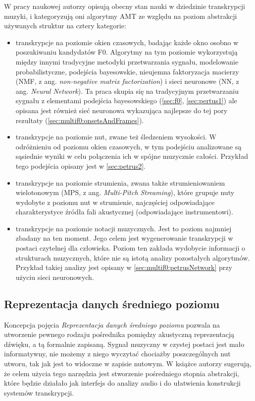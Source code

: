 \documentclass[12pt,a4paper,twoside]{mwart}
\begin{document}
W pracy naukowej 
\cite[22-24]{DBLP:journals/spm/BenetosDDE19}
 autorzy opisują obecny stan nauki w dziedzinie transkrypcji muzyki, i kategoryzują oni algorytmy AMT ze względu na poziom abstrakcji używanych struktur na cztery kategorie:
\begin{itemize}
  \item transkrypcje na poziomie okien czasowych, badając każde okno osobno w poszukiwaniu kandydatów F0. Algorytmy na tym poziomie wykorzystują między innymi tradycyjne metodyki przetwarzania sygnału, modelowanie probabilistyczne, podejścia bayesowskie, nieujemna faktoryzacja macierzy (NMF, z ang. \textit{non-negative matrix factorization}) i sieci neuronowe (NN, z ang. \textit{Neural Network}). Ta praca skupia się na tradycyjnym przetwarzaniu sygnału z elementami podejścia bayesowskiego (\ref{sec:f0}, \ref{sec:pertus1}) ale opisana jest również sieć neuronowa wykazująca najlepsze do tej pory rezultaty (\ref{sec:multif0:onsetsAndFrames}).
  \item transkrypcje na poziomie nut, zwane też śledzeniem wysokości. W odróżnieniu od poziomu okien czasowych, w tym podejściu analizowane są sąsiednie wyniki w celu połączenia ich w spójne muzycznie całości. Przykład tego podejścia opisany jest w \ref{sec:petrus2}.
  \item transkrypcje na poziomie strumienia, zwana także strumieniowaniem wielotonowym (MPS, z ang. \textit{Multi-Pitch Streaming}), które grupuje nuty wydobyte z poziomu nut w strumienie, najczęściej odpowiadające charakterystyce źródła fali akustycznej (odpowiadające instrumentowi).
  \item transkrypcje na poziomie notacji muzycznych. Jest to poziom najmniej zbadany na ten moment. Jego celem jest wygenerowanie transkrypcji w postaci czytelnej dla człowieka. Poziom ten zakłada wydobycie informacji  o strukturach muzycznych, które nie są istotą analizy pozostałych algorytmów. Przykład takiej analizy jest opisany w \ref{sec:multif0:petrusNetwork} przy użyciu sieci neuronowych.
\end{itemize}


\subsection{Reprezentacja danych średniego poziomu}
Koncepcja pojęcia \textit{Reprezentacja danych średniego poziomu} pozwala na utworzenie pewnego rodzaju pośrednika pomiędzy akustyczną reprezentacją dźwięku, a tą formalnie zapisaną. Sygnał muzyczny w czystej postaci jest mało informatywny, nie możemy z niego wyczytać chociażby poszczególnych nut utworu, tak jak jest to widoczne w zapisie nutowym. W książce 
\cite[13-17]{Transcription:Anssi:SignalProcessingMethods}
 autorzy sugerują, że celem użycia tego narzędzia jest stworzenie pośredniego stopnia abstrakcji, które będzie działało jak interfejs do analizy audio i do ułatwienia konstrukcji systemów transkrypcji.
\end{document}

